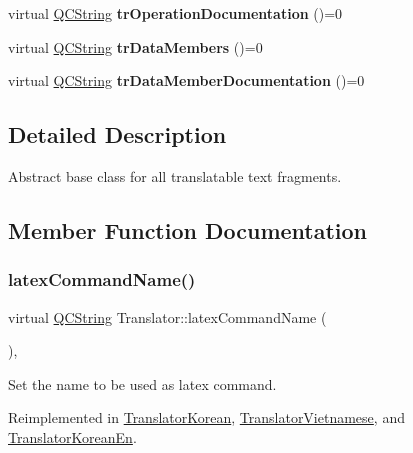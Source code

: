 \begin{DoxyCompactItemize}
virtual \mbox{\hyperlink{class_q_c_string}{Q\+C\+String}} {\bfseries tr\+Operation\+Documentation} ()=0
\item 
\mbox{\label{class_translator_a5775a63083678b134dcda60ad14674bd}} 
virtual \mbox{\hyperlink{class_q_c_string}{Q\+C\+String}} {\bfseries tr\+Data\+Members} ()=0
\item 
\mbox{\label{class_translator_a2fe2c78152cbf79bc7c06f740ba39c7e}} 
virtual \mbox{\hyperlink{class_q_c_string}{Q\+C\+String}} {\bfseries tr\+Data\+Member\+Documentation} ()=0
\end{DoxyCompactItemize}


\subsection{Detailed Description}
Abstract base class for all translatable text fragments. 

\subsection{Member Function Documentation}
\mbox{\label{class_translator_a9e87df46e59ca15713f43205aeb17ea0}} 
\subsubsection{\texorpdfstring{latexCommandName()}{latexCommandName()}}
{\footnotesize\ttfamily virtual \mbox{\hyperlink{class_q_c_string}{Q\+C\+String}} Translator\+::latex\+Command\+Name (\begin{DoxyParamCaption}{ }\end{DoxyParamCaption})\hspace{0.3cm}{\ttfamily [inline]}, {\ttfamily [virtual]}}

Set the name to be used as latex command. 

Reimplemented in \mbox{\hyperlink{class_translator_korean_af309b5d610ebe93451744e88db8a0f20}{Translator\+Korean}}, \mbox{\hyperlink{class_translator_vietnamese_aa25246769e54e9e07fa253a31666b824}{Translator\+Vietnamese}}, and \mbox{\hyperlink{class_translator_korean_en_a3b71d2ee009c7e529e60cb43898bcce7}{Translator\+Korean\+En}}.

